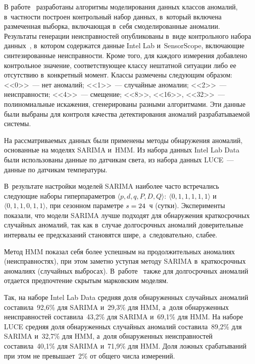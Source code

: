 \begin{multicols}{2}
      В работе~\cite{10-st} разработаны алгоритмы моделирования данных 
классов аномалий, в~част\-ности построен контрольный набор данных, в~который\linebreak 
включена размеченная выборка, включающая в~себя смоделированные 
аномалии. Результаты генерации неисправностей опубликованы в~виде 
контрольно\-го набора данных~\cite{11-st}, в~котором содержатся данные 
Intel Lab и~SensorScope, включающие синтезированные неисправности. Кроме того, для 
каж\-до\-го измерения добавлено контрольное значение, соответствующее классу 
нештатной ситуации либо ее отсутствию в~конкретный момент. Классы 
размечены следующим образом: <<0>>~--- нет аномалий; <<1>>~--- случайные 
аномалии; <<2>>~--- неисправности; <<4>>~--- смещение; <<8>>, <<16>>, 
<<32>>~--- полиномиальные искажения, сгенерированы разными алгоритмами. 
Эти данные были выбраны для контроля качества детектирования аномалий 
разрабатываемой сис\-темы. 
      
      На рассматриваемых данных были применены методы обнаружения 
аномалий, основанные на моделях SARIMA и~HMM. Из набора данных 
{Intel Lab Data} были использованы данные по датчикам света, из набора 
данных {LUCE}~--- данные по датчикам температуры. 
      
      В~результате настройки моделей SARIMA наиболее часто встречались 
следующие наборы гиперпараметров $\langle p, d, q, P, D, Q\rangle:\ \langle 0, 1, 
1, 1, 1, 1\rangle$ и~$\langle 0, 1, 1, 0, 1, 1\rangle$, при сезонном параметре $s 
\hm= 24$~ч (сутки). Эксперименты показали, что модели \mbox{SARIMA} лучше 
подходят для обнаружения краткосрочных случайных аномалий, так как 
в~случае долгосрочных аномалий доверительные интервалы ее предсказаний 
становятся шире, а~следовательно, слабее.
      
      Метод HMM показал себя более успешным на продолжительных 
аномалиях (неисправностях), при этом заметно уступая методу SARIMA 
в~краткосрочных аномалиях (случайных выбросах). В~работе~\cite{12-st} 
также для долгосрочных аномалий отдается предпочтение скрытым 
марковским моделям.
      
      Так, на наборе {Intel Lab Data} средняя доля обнаруженных 
случайных аномалий составила~92,6\% для SARIMA и~29,3\% для HMM, 
а~доля обнаруженных неисправностей составила~43,2\% для \mbox{SARIMA} 
и~69,1\% для HMM. На наборе {LUCE} средняя доля обнаруженных 
случайных аномалий составила~89,2\% для \mbox{SARIMA} и~32,7\% для HMM, 
а~доля обнаруженных неисправностей составила~40,1\% для SARIMA 
и~71,9\% для HMM. Доля ложных срабатываний при этом не превышает~2\% 
от общего числа измерений.
      

\end{multicols}
